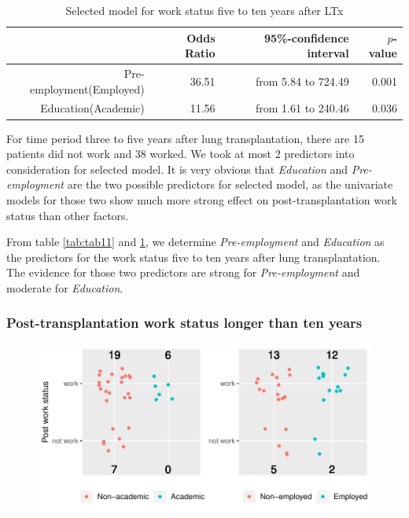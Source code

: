 \documentclass[11pt, a4paper]{article}\usepackage[]{graphicx}\usepackage[]{color}
\makeatletter
\def\maxwidth{ %
  \ifdim\Gin@nat@width>\linewidth
    \linewidth
  \else
    \Gin@nat@width
  \fi
}
\newenvironment{knitrout}{}{} %
\makeatother
\begin{document}
{%
\begin{table}[!h]
\centering
\caption{Selected model for work status 
                five to ten years after LTx} 
\label{tab:tab12}
\begingroup\footnotesize
\begin{tabular}{rrrr}
  \hline
 & Odds Ratio & 95\%-confidence interval & $p$-value \\ 
  \hline
Pre-employment(Employed) & 36.51 & from 5.84 to 724.49 & 0.001 \\ 
  Education(Academic) & 11.56 & from 1.61 to 240.46 & 0.036 \\ 
   \hline
\end{tabular}
\endgroup
\end{table}




For time period three to five years after lung transplantation, there are 15 patients did not work and 38 worked.
We took at most 2 predictors into consideration for selected model. It is very obvious that \textit{Education} and \textit{Pre-employment} are the two possible predictors for selected model, as the univariate models for those two show much more strong effect on post-transplantation work status than other factors.

From table \ref{tab:tab11} and \ref{tab:tab12}, we determine \textit{Pre-employment} and \textit{Education} as the predictors for the work status five to ten years after lung transplantation. The evidence for those two predictors are strong for \textit{Pre-employment} and moderate for \textit{Education}.

\clearpage
\subsubsection*{Post-transplantation work status longer than ten years} \label{subsubsec:logis3}
\begin{figure}[ht]
\begin{knitrout}
\color{fgcolor}
\includegraphics[width=\maxwidth]{plots/ptwoby2plot2-1} 


\end{knitrout}
\end{figure}}
\end{document}
